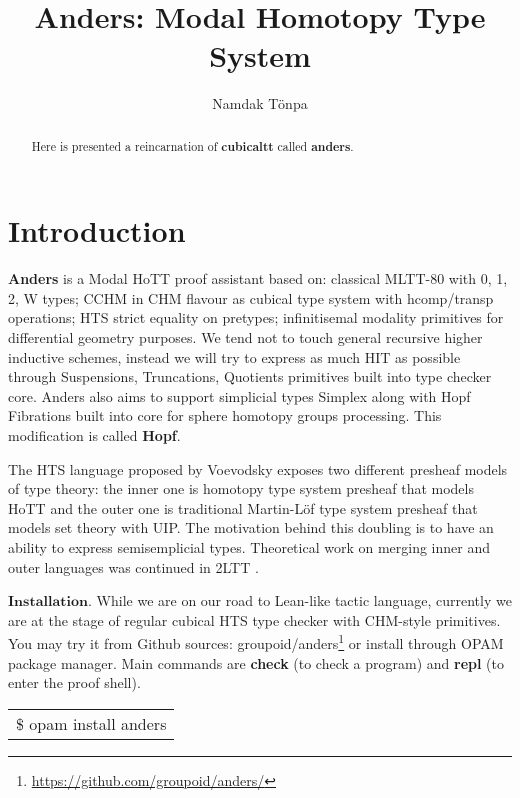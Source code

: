 \documentclass[a4paper,UKenglish,cleveref, autoref, thm-restate]{lipics-v2021}
\title{Anders: Modal Homotopy Type System}
\author{Namdak Tönpa}{Groupoid Infinity}{maxim@synrc.com}{https://orcid.org/0000-0001-7127-8796}{}
\begin{document}
\maketitle

\begin{abstract}
Here is presented a reincarnation of \textbf{cubicaltt} called \textbf{anders}.
\end{abstract}

\section{Introduction}
\label{sec:typesetting-summary}

\textbf{Anders} is a Modal HoTT proof assistant based on: classical MLTT-80 \cite{MLTT80}
with 0, 1, 2, W types; CCHM \cite{CCHM} in CHM \cite{CHM} flavour as cubical type system with
hcomp/transp operations; HTS \cite{HTS} strict equality on pretypes;
infinitisemal \cite{deRham} modality primitives for differential geometry purposes.
We tend not to touch general recursive higher inductive schemes,
instead we will try to express as much HIT as possible through Suspensions, Truncations,
Quotients primitives built into type checker core.
Anders also aims to support simplicial types Simplex along with Hopf Fibrations
built into core for sphere homotopy groups processing. This modification is called \textbf{Hopf}.

The HTS language proposed by Voevodsky exposes two different presheaf models of type theory:
the inner one is homotopy type system presheaf that models HoTT and the outer one is
traditional Martin-Löf type system presheaf that models set theory with UIP.
The motivation behind this doubling is to have an ability to express semisemplicial types.
Theoretical work on merging inner and outer languages was continued in 2LTT \cite{2LTT}.

$\mathbf{Installation}$. While we are on our road to Lean-like tactic language, currently we are at the stage of
regular cubical HTS type checker with CHM-style primitives. You may try it from Github
sources: groupoid/anders\footnote{\url{https://github.com/groupoid/anders/}} or install
through OPAM package manager. Main commands are \textbf{check} (to check a program)
and \textbf{repl} (to enter the proof shell).

\begin{table}[ht]
\centering
\begin{tabular}{l}
\$ opam install anders
\end{tabular}
\end{table}
\end{document}

